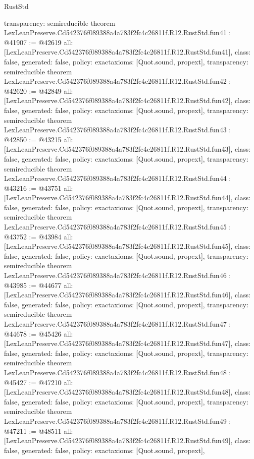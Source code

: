 \begin{lexlean}{RustStd}
\begin{coremodule}
{  transparency: semireducible
}
theorem LexLeanPreserve.Cd542376f089388a4a783f2fc4c26811f.R12.RustStd.fun41 : @41907 := @42619 {
  all: [LexLeanPreserve.Cd542376f089388a4a783f2fc4c26811f.R12.RustStd.fun41],
  class: false,
  generated: false,
  policy: exact{axioms: [Quot.sound, propext]},
  transparency: semireducible
}
theorem LexLeanPreserve.Cd542376f089388a4a783f2fc4c26811f.R12.RustStd.fun42 : @42620 := @42849 {
  all: [LexLeanPreserve.Cd542376f089388a4a783f2fc4c26811f.R12.RustStd.fun42],
  class: false,
  generated: false,
  policy: exact{axioms: [Quot.sound, propext]},
  transparency: semireducible
}
theorem LexLeanPreserve.Cd542376f089388a4a783f2fc4c26811f.R12.RustStd.fun43 : @42850 := @43215 {
  all: [LexLeanPreserve.Cd542376f089388a4a783f2fc4c26811f.R12.RustStd.fun43],
  class: false,
  generated: false,
  policy: exact{axioms: [Quot.sound, propext]},
  transparency: semireducible
}
theorem LexLeanPreserve.Cd542376f089388a4a783f2fc4c26811f.R12.RustStd.fun44 : @43216 := @43751 {
  all: [LexLeanPreserve.Cd542376f089388a4a783f2fc4c26811f.R12.RustStd.fun44],
  class: false,
  generated: false,
  policy: exact{axioms: [Quot.sound, propext]},
  transparency: semireducible
}
theorem LexLeanPreserve.Cd542376f089388a4a783f2fc4c26811f.R12.RustStd.fun45 : @43752 := @43984 {
  all: [LexLeanPreserve.Cd542376f089388a4a783f2fc4c26811f.R12.RustStd.fun45],
  class: false,
  generated: false,
  policy: exact{axioms: [Quot.sound, propext]},
  transparency: semireducible
}
theorem LexLeanPreserve.Cd542376f089388a4a783f2fc4c26811f.R12.RustStd.fun46 : @43985 := @44677 {
  all: [LexLeanPreserve.Cd542376f089388a4a783f2fc4c26811f.R12.RustStd.fun46],
  class: false,
  generated: false,
  policy: exact{axioms: [Quot.sound, propext]},
  transparency: semireducible
}
theorem LexLeanPreserve.Cd542376f089388a4a783f2fc4c26811f.R12.RustStd.fun47 : @44678 := @45426 {
  all: [LexLeanPreserve.Cd542376f089388a4a783f2fc4c26811f.R12.RustStd.fun47],
  class: false,
  generated: false,
  policy: exact{axioms: [Quot.sound, propext]},
  transparency: semireducible
}
theorem LexLeanPreserve.Cd542376f089388a4a783f2fc4c26811f.R12.RustStd.fun48 : @45427 := @47210 {
  all: [LexLeanPreserve.Cd542376f089388a4a783f2fc4c26811f.R12.RustStd.fun48],
  class: false,
  generated: false,
  policy: exact{axioms: [Quot.sound, propext]},
  transparency: semireducible
}
theorem LexLeanPreserve.Cd542376f089388a4a783f2fc4c26811f.R12.RustStd.fun49 : @47211 := @48511 {
  all: [LexLeanPreserve.Cd542376f089388a4a783f2fc4c26811f.R12.RustStd.fun49],
  class: false,
  generated: false,
  policy: exact{axioms: [Quot.sound, propext]},
}
\end{coremodule}
\end{lexlean}
